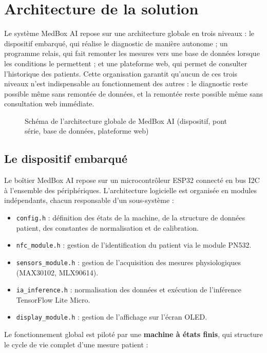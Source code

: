 \documentclass[12pt,a4paper]{report}
\begin{document}
\section{Architecture de la solution}
Le système MedBox AI repose sur une architecture globale en trois niveaux : le dispositif embarqué, qui réalise le diagnostic de manière autonome ; un programme relais, qui fait remonter les mesures vers une base de données lorsque les conditions le permettent ; et une plateforme web, qui permet de consulter l'historique des patients. Cette organisation garantit qu'aucun de ces trois niveaux n'est indispensable au fonctionnement des autres : le diagnostic reste possible même sans remontée de données, et la remontée reste possible même sans consultation web immédiate.

\begin{figure}[H]
    \centering
    \caption{Schéma de l'architecture globale de MedBox AI (dispositif, pont série, base de données, plateforme web)}
    \label{fig:architecture}
\end{figure}

\subsection*{Le dispositif embarqué}
Le boîtier MedBox AI repose sur un microcontrôleur ESP32 connecté en bus I2C à l'ensemble des périphériques. L'architecture logicielle est organisée en modules indépendants, chacun responsable d'un sous-système :

\begin{itemize}
    \item \texttt{config.h} : définition des états de la machine, de la structure de données patient, des constantes de normalisation et de calibration.
    \item \texttt{nfc\_module.h} : gestion de l'identification du patient via le module PN532.
    \item \texttt{sensors\_module.h} : gestion de l'acquisition des mesures physiologiques (MAX30102, MLX90614).
    \item \texttt{ia\_inference.h} : normalisation des données et exécution de l'inférence TensorFlow Lite Micro.
    \item \texttt{display\_module.h} : gestion de l'affichage sur l'écran OLED.
\end{itemize}

Le fonctionnement global est piloté par une \textbf{machine à états finis}, qui structure le cycle de vie complet d'une mesure patient :
\end{document}
